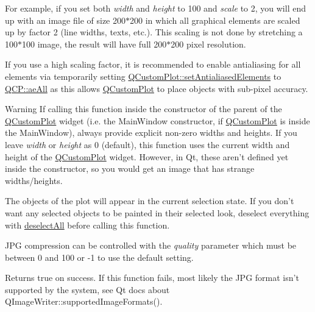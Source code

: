 \-For example, if you set both {\itshape width\/} and {\itshape height\/} to 100 and {\itshape scale\/} to 2, you will end up with an image file of size 200$\ast$200 in which all graphical elements are scaled up by factor 2 (line widths, texts, etc.). \-This scaling is not done by stretching a 100$\ast$100 image, the result will have full 200$\ast$200 pixel resolution.

\-If you use a high scaling factor, it is recommended to enable antialiasing for all elements via temporarily setting \hyperlink{classQCustomPlot_af6f91e5eab1be85f67c556e98c3745e8}{\-Q\-Custom\-Plot\-::set\-Antialiased\-Elements} to \hyperlink{namespaceQCP_ae55dbe315d41fe80f29ba88100843a0caa897c232a0ffc8368e7c100ffc59ef31}{\-Q\-C\-P\-::ae\-All} as this allows \hyperlink{classQCustomPlot}{\-Q\-Custom\-Plot} to place objects with sub-\/pixel accuracy.

\begin{DoxyWarning}{\-Warning}
\-If calling this function inside the constructor of the parent of the \hyperlink{classQCustomPlot}{\-Q\-Custom\-Plot} widget (i.\-e. the \-Main\-Window constructor, if \hyperlink{classQCustomPlot}{\-Q\-Custom\-Plot} is inside the \-Main\-Window), always provide explicit non-\/zero widths and heights. \-If you leave {\itshape width\/} or {\itshape height\/} as 0 (default), this function uses the current width and height of the \hyperlink{classQCustomPlot}{\-Q\-Custom\-Plot} widget. \-However, in \-Qt, these aren't defined yet inside the constructor, so you would get an image that has strange widths/heights.
\end{DoxyWarning}
\-The objects of the plot will appear in the current selection state. \-If you don't want any selected objects to be painted in their selected look, deselect everything with \hyperlink{classQCustomPlot_a9d4808ab925b003054085246c92a257c}{deselect\-All} before calling this function.

\-J\-P\-G compression can be controlled with the {\itshape quality\/} parameter which must be between 0 and 100 or -\/1 to use the default setting.

\-Returns true on success. \-If this function fails, most likely the \-J\-P\-G format isn't supported by the system, see \-Qt docs about \-Q\-Image\-Writer\-::supported\-Image\-Formats().

